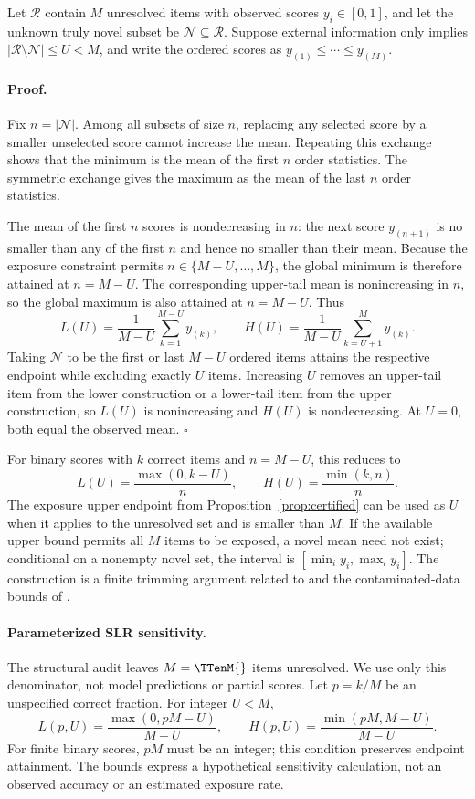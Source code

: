 Let $\mathcal R$ contain $M$ unresolved items with observed scores
$y_i\in[0,1]$, and let the unknown truly novel subset be
$\mathcal N\subseteq\mathcal R$.  Suppose external information only implies
$|\mathcal R\setminus\mathcal N|\leq U<M$, and write the ordered scores as
$y_{(1)}\leq\cdots\leq y_{(M)}$.

\paragraph{Proof.}
Fix $n=|\mathcal N|$.  Among all subsets of size $n$, replacing any selected
score by a smaller unselected score cannot increase the mean.  Repeating this
exchange shows that the minimum is the mean of the first $n$ order
statistics.  The symmetric exchange gives the maximum as the mean of the
last $n$ order statistics.

The mean of the first $n$ scores is nondecreasing in $n$: the next score
$y_{(n+1)}$ is no smaller than any of the first $n$ and hence no smaller than
their mean.  Because the exposure constraint permits
$n\in\{M-U,\ldots,M\}$, the global minimum is therefore attained at
$n=M-U$.  The corresponding upper-tail mean is nonincreasing in $n$, so the
global maximum is also attained at $n=M-U$.  Thus
\[
L(U)=\frac{1}{M-U}\sum_{k=1}^{M-U}y_{(k)},\qquad
H(U)=\frac{1}{M-U}\sum_{k=U+1}^{M}y_{(k)}.
\]
Taking $\mathcal N$ to be the first or last $M-U$ ordered items attains the
respective endpoint while excluding exactly $U$ items.  Increasing $U$
removes an upper-tail item from the lower construction or a lower-tail item
from the upper construction, so $L(U)$ is nonincreasing and $H(U)$ is
nondecreasing.  At $U=0$, both equal the observed mean. \(\square\)

For binary scores with $k$ correct items and $n=M-U$, this reduces to
\[
L(U)=\frac{\max(0,k-U)}{n},\qquad
H(U)=\frac{\min(k,n)}{n}.
\]
The exposure upper endpoint from Proposition~\ref{prop:certified} can be
used as $U$ when it applies to the unresolved set and is smaller than $M$.
If the available upper bound permits all $M$ items to be exposed, a novel
mean need not exist; conditional on a nonempty novel set, the interval is
$[\min_i y_i,\max_i y_i]$.  The construction is a finite trimming
argument related to \citet{lee2009training} and the contaminated-data bounds
of \citet{horowitz1995identification}.

\paragraph{Parameterized SLR sensitivity.}
The structural audit leaves $M=\TTenM{}$ items unresolved.  We use only
this denominator, not model predictions or partial scores.  Let $p=k/M$
be an unspecified correct fraction.  For integer $U<M$,
\[
L(p,U)=\frac{\max(0,pM-U)}{M-U},\qquad
H(p,U)=\frac{\min(pM,M-U)}{M-U}.
\]
For finite binary scores, $pM$ must be an integer; this condition preserves
endpoint attainment.  The bounds express a hypothetical sensitivity
calculation, not an observed accuracy or an estimated exposure rate.

